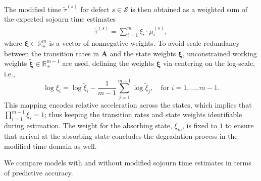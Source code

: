 \documentclass{article}
\begin{document}

The modified time $\widetilde{\tau}^{(s)}$ for defect $s \in \mathcal S$ is then obtained as a weighted sum of the expected sojourn time estimates
\begin{align}
\widetilde\tau^{(s)}= \sum_{i = 1}^m \xi_i  \cdot \mu_i^{(s)}, \label{eq:warped_time}
\end{align}
where $\bm{\xi} \in \mathbb{R}_+^m$ is a vector of nonnegative weights. 
To avoid scale redundancy between the transition rates in $\bm A$ and the state weights $\bm\xi$, unconstrained working weights $\widetilde{\bm\xi}\in\mathbb{R}_+^{m-1}$ are used, defining the weights $\bm\xi$ via centering on the log-scale, i.e.,
$$
 \log \xi_i = \log\widetilde{\xi}_i - \frac{1}{m-1}\sum_{j=1}^{m-1}\log\widetilde{\xi}_j, \quad \text{for } i = 1, \dots, m-1.
$$
This mapping encodes relative acceleration across the states, which implies that $\prod_{i = 1}^{m-1} \xi_i = 1$; thus keeping the transition rates and state weights identifiable during estimation.
The weight for the absorbing state, $\xi_m$, is fixed to $1$ to ensure that arrival at the absorbing state concludes the degradation process in the modified time domain as well.

We compare models with and without modified sojourn time estimates in terms of predictive accuracy. %


\end{document}
